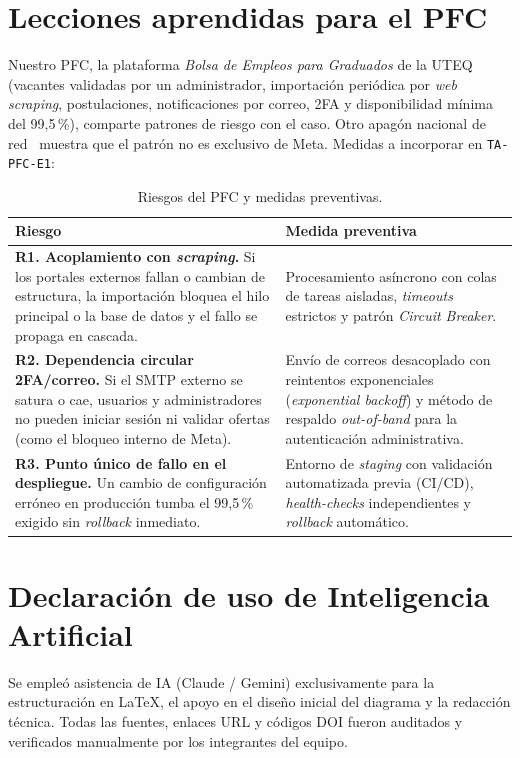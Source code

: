 \documentclass[10pt,a4paper]{article}
\begin{document}
\section{Lecciones aprendidas para el PFC}
Nuestro PFC, la plataforma \textit{Bolsa de Empleos para Graduados} de la UTEQ (vacantes validadas por un administrador, importación periódica por \textit{web scraping}, postulaciones, notificaciones por correo, 2FA y disponibilidad mínima del 99,5\,\%), comparte patrones de riesgo con el caso. Otro apagón nacional de red~\cite{gregory2023optus} muestra que el patrón no es exclusivo de Meta. Medidas a incorporar en \texttt{TA-PFC-E1}:

\begin{table}[H]
\centering\footnotesize
\caption{Riesgos del PFC y medidas preventivas.}\label{tab:pfc}
\begin{tabularx}{\columnwidth}{@{}>{\raggedright\arraybackslash}p{4.3cm} X@{}}
\toprule
\textbf{Riesgo} & \textbf{Medida preventiva}\\\midrule
\textbf{R1. Acoplamiento con \textit{scraping}.} Si los portales externos fallan o cambian de estructura, la importación bloquea el hilo principal o la base de datos y el fallo se propaga en cascada. & Procesamiento asíncrono con colas de tareas aisladas, \textit{timeouts} estrictos y patrón \textit{Circuit Breaker}.\\\addlinespace
\textbf{R2. Dependencia circular 2FA/correo.} Si el SMTP externo se satura o cae, usuarios y administradores no pueden iniciar sesión ni validar ofertas (como el bloqueo interno de Meta). & Envío de correos desacoplado con reintentos exponenciales (\textit{exponential backoff}) y método de respaldo \textit{out-of-band} para la autenticación administrativa.\\\addlinespace
\textbf{R3. Punto único de fallo en el despliegue.} Un cambio de configuración erróneo en producción tumba el 99,5\,\% exigido sin \textit{rollback} inmediato. & Entorno de \textit{staging} con validación automatizada previa (CI/CD), \textit{health-checks} independientes y \textit{rollback} automático.\\
\bottomrule
\end{tabularx}
\end{table}

\section{Declaración de uso de Inteligencia Artificial}
Se empleó asistencia de IA (Claude / Gemini) exclusivamente para la estructuración en \LaTeX, el apoyo en el diseño inicial del diagrama y la redacción técnica. Todas las fuentes, enlaces URL y códigos DOI fueron auditados y verificados manualmente por los integrantes del equipo.

\newpage
\onecolumn
\small


\end{document}
